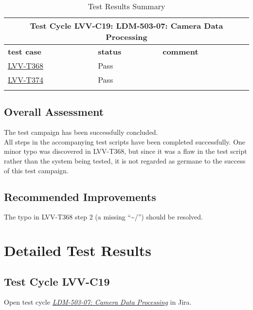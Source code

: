 \documentclass[DM,lsstdraft,STR,toc]{lsstdoc}
\begin{document}
\begin{longtable} {p{}p{}p{}}
\toprule
  \multicolumn{3}{c}{ Test Cycle {\bf LVV-C19: LDM-503-07: Camera Data Processing }} \\\hline
  {\bf \footnotesize test case} & {\bf \footnotesize status} & {\bf \footnotesize comment} \\\toprule
    \href{https://jira.lsstcorp.org/secure/Tests.jspa#/testCase/LVV-T368}{LVV-T368} 
    & Pass & 
    \\\hline
    \href{https://jira.lsstcorp.org/secure/Tests.jspa#/testCase/LVV-T374}{LVV-T374} 
    & Pass & 
    \\\hline

\caption{Test Results Summary}
\label{table:summary}
\end{longtable}

\subsection{Overall Assessment}
\label{sect:overallassessment}

The test campaign has been successfully concluded.\\[2\baselineskip]All
steps in the accompanying test scripts have been completed successfully.
One minor typo was discovered in LVV-T368, but since it was a flaw in
the test script rather than the system being tested, it is not regarded
as germane to the success of this test campaign.


\subsection{Recommended Improvements}
\label{sect:recommendations}

The typo in LVV-T368 step 2 (a missing ``\textasciitilde{}/'') should be
resolved.


\newpage
\section{Detailed Test Results}
\label{sect:detailedtestresults}


  \subsection{Test Cycle LVV-C19 }

Open test cycle {\it \href{https://jira.lsstcorp.org/secure/Tests.jspa#/testrun/LVV-C19}{LDM-503-07: Camera Data Processing}} in Jira.
\end{document}
